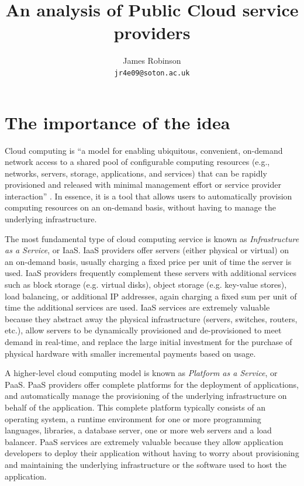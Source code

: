 \documentclass[a4paper]{proc}
\begin{document}
  \title{An analysis of Public Cloud service providers}
  \author{James Robinson\\\texttt{jr4e09@soton.ac.uk}}
  \maketitle

  \begin{abstract}
  \end{abstract}



  \section{The importance of the idea}

  Cloud computing is ``a model for enabling ubiquitous, convenient, on-demand network access to a shared pool of configurable computing resources (e.g., networks, servers, storage, applications, and services) that can be rapidly provisioned and released with minimal management effort or service provider interaction'' \cite{Mell2011}. In essence, it is a tool that allows users to automatically provision computing resources on an on-demand basis, without having to manage the underlying infrastructure.

  The most fundamental type of cloud computing service is known as \emph{Infrastructure as a Service}, or IaaS. IaaS providers offer servers (either physical or virtual) on an on-demand basis, usually charging a fixed price per unit of time the server is used. IaaS providers frequently complement these servers with additional services such as block storage (e.g. virtual disks), object storage (e.g. key-value stores), load balancing, or additional IP addresses, again charging a fixed sum per unit of time the additional services are used. IaaS services are extremely valuable because they abstract away the physical infrastructure (servers, switches, routers, etc.), allow servers to be dynamically provisioned and de-provisioned to meet demand in real-time, and replace the large initial investment for the purchase of physical hardware with smaller incremental payments based on usage.

  A higher-level cloud computing model is known as \emph{Platform as a Service}, or PaaS. PaaS providers offer complete platforms for the deployment of applications, and automatically manage the provisioning of the underlying infrastructure on behalf of the application. This complete platform typically consists of an operating system, a runtime environment for one or more programming languages, libraries, a database server, one or more web servers and a load balancer. PaaS services are extremely valuable because they allow application developers to deploy their application without having to worry about provisioning and maintaining the underlying infrastructure or the software used to host the application.
\end{document}
